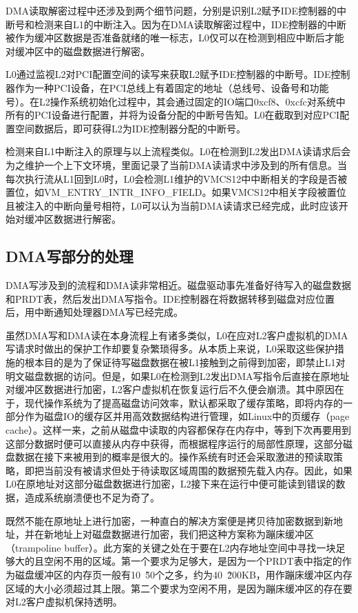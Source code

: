 DMA读取解密过程中还涉及到两个细节问题，分别是识别L2赋予IDE控制器的中断号和检测来自L1的中断注入。因为在DMA读取解密过程中，IDE控制器的中断被作为缓冲区数据是否准备就绪的唯一标志，L0仅可以在检测到相应中断后才能对缓冲区中的磁盘数据进行解密。

L0通过监视L2对PCI配置空间的读写来获取L2赋予IDE控制器的中断号。IDE控制器作为一种PCI设备，在PCI总线上有着固定的地址（总线号、设备号和功能号）。在L2操作系统初始化过程中，其会通过固定的IO端口0xcf8、0xcfc对系统中所有的PCI设备进行配置，并将为设备分配的中断号告知。L0在截取到对应PCI配置空间数据后，即可获得L2为IDE控制器分配的中断号。

检测来自L1中断注入的原理与以上流程类似。L0在检测到L2发出DMA读请求后会为之维护一个上下文环境，里面记录了当前DMA读请求中涉及到的所有信息。当每次执行流从L1回到L0时，L0会检测L1维护的VMCS12中中断相关的字段是否被置位，如VM\_ENTRY\_INTR\_INFO\_FIELD。如果VMCS12中相关字段被置位且被注入的中断向量号相符，L0可以认为当前DMA读请求已经完成，此时应该开始对缓冲区数据进行解密。

\subsection{DMA写部分的处理}

DMA写涉及到的流程和DMA读非常相近。磁盘驱动事先准备好待写入的磁盘数据和PRDT表，然后发出DMA写指令。IDE控制器在将数据转移到磁盘对应位置后，用中断通知处理器DMA写已经完成。

虽然DMA写和DMA读在本身流程上有诸多类似，L0在应对L2客户虚拟机的DMA写请求时做出的保护工作却要复杂繁琐得多。从本质上来说，L0采取这些保护措施的根本目的是为了保证待写磁盘数据在被L1接触到之前得到加密，即禁止L1对明文磁盘数据的访问。但是，如果L0在检测到L2发出DMA写指令后直接在原地址对缓冲区数据进行加密，L2客户虚拟机在恢复运行后不久便会崩溃。其中原因在于，现代操作系统为了提高磁盘访问效率，默认都采取了缓存策略，即将内存的一部分作为磁盘IO的缓存区并用高效数据结构进行管理，如Linux中的页缓存（page cache）。这样一来，之前从磁盘中读取的内容都保存在内存中，等到下次再要用到这部分数据时便可以直接从内存中获得，而根据程序运行的局部性原理，这部分磁盘数据在接下来被用到的概率是很大的。操作系统有时还会采取激进的预读取策略，即把当前没有被请求但处于待读取区域周围的数据预先载入内存。因此，如果L0在原地址对这部分磁盘数据进行加密，L2接下来在运行中便可能读到错误的数据，造成系统崩溃便也不足为奇了。

既然不能在原地址上进行加密，一种直白的解决方案便是拷贝待加密数据到新地址，并在新地址上对磁盘数据进行加密，我们把这种方案称为蹦床缓冲区（trampoline buffer）。此方案的关键之处在于要在L2内存地址空间中寻找一块足够大的且空闲不用的区域。第一个要求为足够大，是因为一个PRDT表中指定的作为磁盘缓冲区的内存页一般有10~\~50个之多，约为40~\~200KB，用作蹦床缓冲区内存区域的大小必须超过其上限。第二个要求为空闲不用，是因为蹦床缓冲区的存在要对L2客户虚拟机保持透明。

